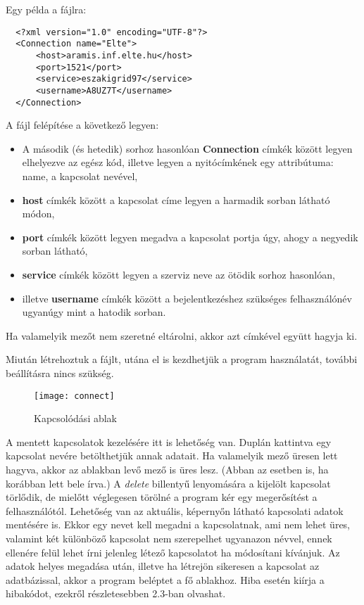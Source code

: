 Egy példa a fájlra:

\begin{lstlisting}
  <?xml version="1.0" encoding="UTF-8"?>
  <Connection name="Elte">
      <host>aramis.inf.elte.hu</host>
      <port>1521</port>
      <service>eszakigrid97</service>
      <username>A8UZ7T</username>
  </Connection>
\end{lstlisting}

A fájl felépítése a következő legyen:
\begin{itemize}
  \item A második (és hetedik) sorhoz hasonlóan \textbf{Connection} címkék között legyen elhelyezve az egész kód, illetve legyen a
  nyitócímkének egy attribútuma: name, a kapcsolat nevével,
  \item \textbf{host} címkék között a kapcsolat címe legyen a harmadik sorban látható módon,
  \item \textbf{port} címkék között legyen megadva a kapcsolat portja úgy, ahogy a negyedik sorban látható,
  \item \textbf{service} címkék között legyen a szerviz neve az ötödik sorhoz hasonlóan,
  \item illetve \textbf{username} címkék között a bejelentkezéshez szükséges felhasználónév ugyanúgy mint a hatodik sorban.
\end{itemize}
Ha valamelyik mezőt nem szeretné eltárolni, akkor azt címkével együtt hagyja ki.

Miután létrehoztuk a fájlt, utána el is kezdhetjük a program használatát, további beállításra nincs szükség.
\begin{figure}[ht]
  \begin{center}
  \texttt{[image: connect]}
  \end{center}
 \caption{Kapcsolódási ablak}
\end{figure}
A mentett kapcsolatok kezelésére itt is lehetőség van.
Duplán kattintva egy kapcsolat nevére betölthetjük annak adatait. Ha valamelyik mező üresen lett hagyva,
akkor az ablakban levő mező is üres lesz. (Abban az esetben is, ha korábban lett bele írva.)
A \textit{delete} billentyű lenyomására a kijelölt kapcsolat törlődik, de
mielőtt véglegesen törölné a program kér egy megerősítést a felhasználótól.
Lehetőség van az aktuális, képernyőn látható kapcsolati adatok mentésére is. Ekkor egy nevet kell megadni a kapcsolatnak, ami nem lehet üres,
valamint két különböző kapcsolat nem szerepelhet ugyanazon névvel, ennek ellenére felül lehet írni jelenleg létező kapcsolatot ha módosítani
kívánjuk.
Az adatok helyes megadása után, illetve ha létrejön sikeresen a kapcsolat az adatbázissal, akkor a program beléptet a fő ablakhoz.
Hiba esetén kiírja a hibakódot, ezekről részletesebben 2.3-ban olvashat.

